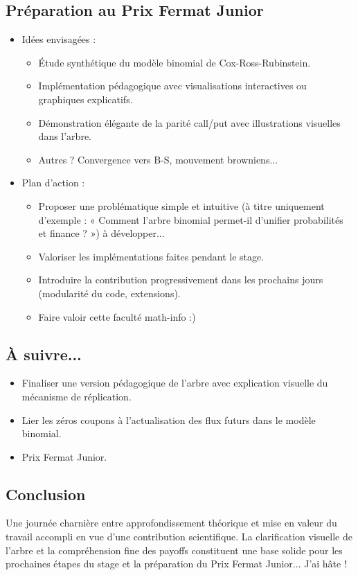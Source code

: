 \documentclass[a4paper,11pt]{article}
\begin{document}
\subsection{Préparation au Prix Fermat Junior}
\begin{itemize}
    \item Idées envisagées :
    \begin{itemize}
        \item Étude synthétique du modèle binomial de Cox-Ross-Rubinstein.
        \item Implémentation pédagogique avec visualisations interactives ou graphiques explicatifs.
        \item Démonstration élégante de la parité call/put avec illustrations visuelles dans l’arbre.
        \item Autres ? Convergence vers B-S, mouvement browniens...
    \end{itemize}
    \item Plan d’action : 
    \begin{itemize}
        \item Proposer une problématique simple et intuitive (à titre uniquement d'exemple : « Comment l’arbre binomial permet-il d’unifier probabilités et finance ? ») à développer...
        \item Valoriser les implémentations faites pendant le stage.
        \item Introduire la contribution progressivement dans les prochains jours (modularité du code, extensions).
        \item Faire valoir cette faculté math-info :)
    \end{itemize}
\end{itemize}

\subsection{À suivre...}
\begin{itemize}
    \item Finaliser une version pédagogique de l’arbre avec explication visuelle du mécanisme de réplication.
    \item Lier les zéros coupons à l’actualisation des flux futurs dans le modèle binomial.
    \item Prix Fermat Junior.
\end{itemize}

\subsection{Conclusion}
Une journée charnière entre approfondissement théorique et mise en valeur du travail accompli en vue d’une contribution scientifique. La clarification visuelle de l’arbre et la compréhension fine des payoffs constituent une base solide pour les prochaines étapes du stage et la préparation du Prix Fermat Junior... J'ai hâte !
\newpage
\end{document}
